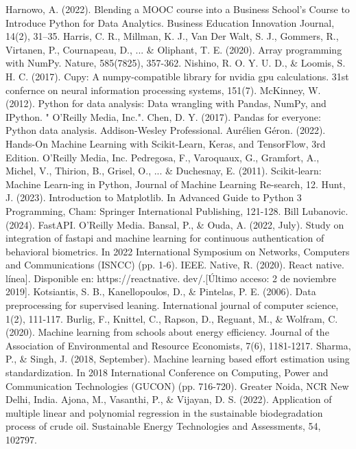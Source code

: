 \documentclass[12pt,a4paper]{article}
\begin{document}
\begin{enumerate}
\begin{thebibliography}{99}
 Harnowo, A. (2022). Blending a MOOC course into a Business School’s Course to Introduce Python for Data Analytics. Business Education Innovation Journal, 14(2), 31–35.
 Harris, C. R., Millman, K. J., Van Der Walt, S. J., Gommers, R., Virtanen, P., Cournapeau, D., ... \& Oliphant, T. E. (2020). Array programming with NumPy. Nature, 585(7825), 357-362.
 Nishino, R. O. Y. U. D., \& Loomis, S. H. C. (2017). Cupy: A numpy-compatible library for nvidia gpu calculations. 31st confernce on neural information processing systems, 151(7).
 McKinney, W. (2012). Python for data analysis: Data wrangling with Pandas, NumPy, and IPython. " O'Reilly Media, Inc.".
 Chen, D. Y. (2017). Pandas for everyone: Python data analysis. Addison-Wesley Professional.
 Aurélien Géron. (2022). Hands-On Machine Learning with Scikit-Learn, Keras, and TensorFlow, 3rd Edition. O’Reilly Media, Inc.
 Pedregosa, F., Varoquaux, G., Gramfort, A., Michel, V., Thirion, B., Grisel, O., ... \& Duchesnay, E. (2011). Scikit-learn: Machine Learn-ing in Python, Journal of Machine Learning Re-search, 12.
 Hunt, J. (2023). Introduction to Matplotlib. In Advanced Guide to Python 3 Programming, Cham: Springer International Publishing, 121-128.
 Bill Lubanovic. (2024). FastAPI. O’Reilly Media.
 Bansal, P., \& Ouda, A. (2022, July). Study on integration of fastapi and machine learning for continuous authentication of behavioral biometrics. In 2022 International Symposium on Networks, Computers and Communications (ISNCC) (pp. 1-6). IEEE.
 Native, R. (2020). React native. línea]. Disponible en: https://reactnative. dev/.[Último acceso: 2 de noviembre 2019].
 Kotsiantis, S. B., Kanellopoulos, D., \& Pintelas, P. E. (2006). Data preprocessing for supervised leaning. International journal of computer science, 1(2), 111-117.
 Burlig, F., Knittel, C., Rapson, D., Reguant, M., \& Wolfram, C. (2020). Machine learning from schools about energy efficiency. Journal of the Association of Environmental and Resource Economists, 7(6), 1181-1217.
 Sharma, P., \& Singh, J. (2018, September). Machine learning based effort estimation using standardization. In 2018 International Conference on Computing, Power and Communication Technologies (GUCON) (pp. 716-720).  Greater Noida, NCR New Delhi, India.
 Ajona, M., Vasanthi, P., \& Vijayan, D. S. (2022). Application of multiple linear and polynomial regression in the sustainable biodegradation process of crude oil. Sustainable Energy Technologies and Assessments, 54, 102797.

\end{thebibliography}
\end{enumerate}
\end{document}
